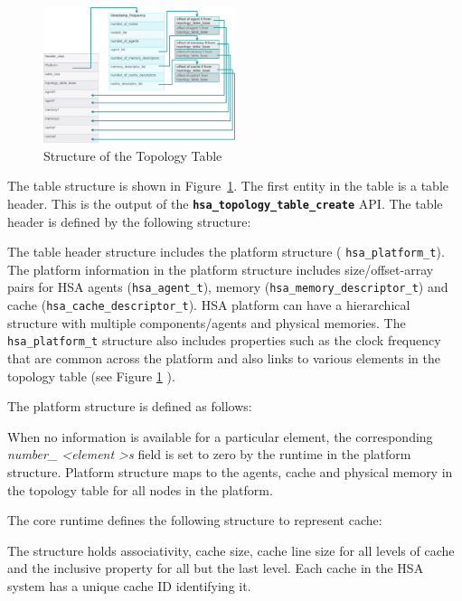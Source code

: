 \documentclass{book}
\newcommand{\diffblock}[1]{#1}
\newcommand{\ttbf}[1]{\diffblock{\texttt{\textbf{#1}}}}
\newcommand{\dbtt}[1]{\diffblock{\texttt{#1}}}
\begin{document}
\begin{figure}
  \centering
  \includegraphics[width=0.5\textwidth]{fig/topologytable}
  \centering
  \caption{Structure of the Topology Table}
  \label{fig:topology_table}
\end{figure}

The table structure is shown in Figure~\ref{fig:topology_table}.
The first entity in the table is a table header. This is the output
of the \ttbf{hsa\_topology\_table\_create} API.
The table header is defined by the following structure:


The table header structure includes the platform structure (
\dbtt{hsa\_platform\_t}).  The platform information in the platform
structure includes size/offset-array pairs for HSA agents
(\dbtt{hsa\_agent\_t}), memory (\dbtt{hsa\_memory\_descriptor\_t}) and
cache (\dbtt{hsa\_cache\_descriptor\_t}).
HSA platform can have a hierarchical structure with multiple
components/agents and physical memories.  The
\dbtt{hsa\_platform\_t} structure also includes properties such as
the clock frequency that are common across the platform and also
links to various elements in the topology table (see Figure
\ref{fig:topology_table} ).

The platform structure is defined as follows:



When no information is available for a particular element, the
corresponding {\itshape number\_ \textless element \textgreater s}
field is set to zero by the runtime in the platform structure.
Platform structure maps to the agents, cache and physical memory
in the topology table for all nodes in the platform.

The core runtime defines the following structure to represent cache:

The structure holds associativity, cache size, cache line size for
all levels of cache and the inclusive property for all but the
last level. Each cache in the HSA system has a unique cache ID
identifying it.
\end{document}
